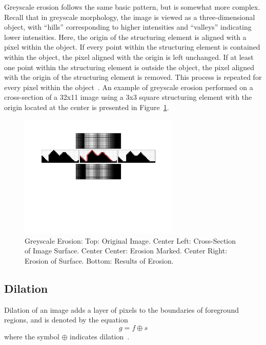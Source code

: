 \documentclass{sig-alternate}
\begin{document}
Greyscale erosion follows the same basic pattern, but is somewhat more complex. Recall that in greyscale morphology, the image is viewed as a three-dimensional object, with ``hills'' corresponding to higher intensities and ``valleys'' indicating lower intensities. Here, the origin of the structuring element is aligned with a pixel within the object. If every point within the structuring element is contained within the object, the pixel aligned with the origin is left unchanged. If at least one point within the structuring element is outside the object, the pixel aligned with the origin of the structuring element is removed. This process is repeated for every pixel within the object~\cite{MorphologyPaper:1987, MorphologyWiki}. An example of greyscale erosion performed on a cross-section of a 32x11 image using a 3x3 square structuring element with the origin located at the center is presented in Figure~\ref{greyscale erosion figure}.
\begin{figure}
\centering
\includegraphics[width=3in,trim={0 4in 0 0},clip]{greyscale_erosion}
\caption{Greyscale Erosion: Top: Original Image. Center Left: Cross-Section of Image Surface. Center Center: Erosion Marked. Center Right: Erosion of Surface. Bottom: Results of Erosion.}
\label{greyscale erosion figure}
\end{figure}

\subsection{Dilation}\label{dilation}
Dilation of an image adds a layer of pixels to the boundaries of foreground regions, and is denoted by the equation
\begin{equation*}
g = f \oplus s
\end{equation*}
where the symbol $\oplus$ indicates dilation~\cite{MorphologyWikiAnonymous, MorphologyBook:2000}.
\end{document}
